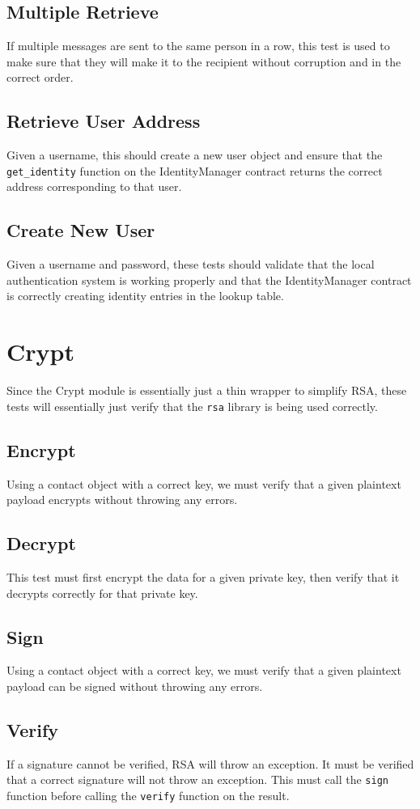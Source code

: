 \documentclass[titlepage]{report}
\begin{document}
\subsection{Multiple Retrieve}
If multiple messages are sent to the same person in a row, this test is used to make sure that they will make it to the recipient without corruption and in the correct order.
\subsection{Retrieve User Address}
Given a username, this should create a new user object and ensure that the \texttt{get\_identity} function on the IdentityManager contract returns the correct address corresponding to that user.
\subsection{Create New User}
Given a username and password, these tests should validate that the local authentication system is working properly and that the IdentityManager contract is correctly creating identity entries in the lookup table.

\section{Crypt}
Since the Crypt module is essentially just a thin wrapper to simplify RSA, these tests will essentially just verify that the \texttt{rsa} library is being used correctly.
\subsection{Encrypt}
Using a contact object with a correct key, we must verify that a given plaintext payload encrypts without throwing any errors.
\subsection{Decrypt}
This test must first encrypt the data for a given \gls{private key}, then verify that it decrypts correctly for that \gls{private key}.
\subsection{Sign}
Using a contact object with a correct key, we must verify that a given plaintext payload can be signed without throwing any errors.
\subsection{Verify}
If a signature cannot be verified, RSA will throw an exception. It must be verified that a correct signature will not throw an exception. This must call the \texttt{sign} function before calling the \texttt{verify} function on the result.
\end{document}
